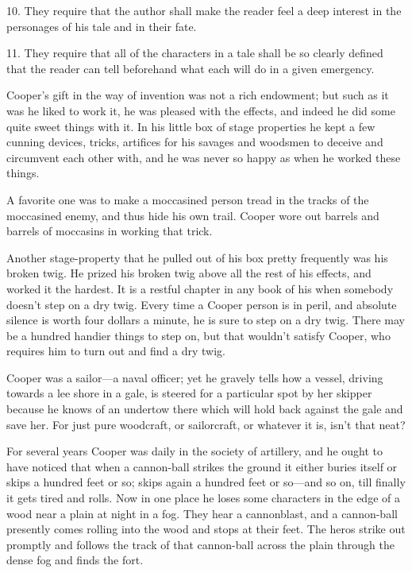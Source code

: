 \documentclass[../demo.tex]{novelette-subdoc}
\begin{document}
10. They require that the author shall make the reader feel a deep
interest in the personages of his tale and in their fate.

11. They require that all of the characters in a tale shall be so
clearly defined that the reader can tell beforehand what each will do in a
given emergency.

Cooper's gift in the way of invention was not a rich endowment; but
such as it was he liked to work it, he was pleased with the effects,
and indeed he did some quite sweet things with it. In his little box of
stage properties he kept a few cunning devices, tricks, artifices
for his savages and woodsmen to deceive and circumvent each other with,
and he was never so happy as when he worked these things.

A favorite one was to make a moccasined person tread
in the tracks of the moccasined enemy, and thus hide his own trail.
Cooper wore out barrels and barrels of moccasins in working that trick.

Another stage-property that he pulled out of his box pretty frequently
was his broken twig. He prized his broken twig above all the rest of his
effects, and worked it the hardest. It is a restful chapter in any book
of his when somebody doesn't step on a dry twig. Every time a Cooper person is
in peril, and absolute silence is worth four dollars a minute, he is
sure to step on a dry twig. There may be a hundred handier things to
step on, but that wouldn't satisfy Cooper, who requires him to turn
out and find a dry twig.

Cooper was a sailor---a naval officer; yet he gravely tells how
a vessel, driving towards a lee shore in a gale, is steered for a
particular spot by her skipper because he knows of an undertow there
which will hold back against the gale and save her. For just pure
woodcraft, or sailorcraft, or whatever it is, isn't that neat?

For several years Cooper was daily in the society of artillery,
and he ought to have noticed that when a cannon-ball strikes the ground it
either buries itself or skips a hundred feet or so; skips again a hundred feet
or so---and so on, till finally it gets tired and rolls. Now in one place
he loses some characters in the edge of a wood
near a plain at night in a fog. They hear a cannonblast, and a
cannon-ball presently comes rolling into the wood and stops at their
feet. The heros strike out promptly and follows the track of that cannon-ball
across the plain through the dense fog and finds the fort.
\end{document}
